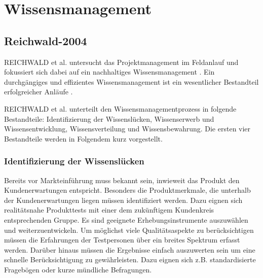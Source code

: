 \section{Wissensmanagement}
\subsection*{Reichwald-2004}
REICHWALD et al. untersucht das Projektmanagement im Feldanlauf und fokussiert sich dabei auf ein nachhaltiges Wissensmanagement \cite{Reichwald2004}. Ein durchgängiges und effizientes Wissensmanagement ist ein wesentlicher Bestandteil erfolgreicher Anläufe \cite{Kuhn2002}. %

REICHWALD et al. unterteilt den Wissensmanagementprozess in folgende Bestandteile: Identifizierung der Wissenslücken, Wissenserwerb und Wissensentwicklung, Wissensverteilung und Wissensbewahrung. Die ersten vier Bestandteile werden in Folgendem kurz vorgestellt. 

\subsubsection*{Identifizierung der Wissenslücken}
Bereits vor Markteinführung muss bekannt sein, inwieweit das Produkt den Kundenerwartungen entspricht. Besonders die Produktmerkmale, die unterhalb der Kundenerwartungen liegen müssen identifiziert werden. Dazu eignen sich realitätsnahe Produkttests mit einer dem zukünftigem Kundenkreis entsprechenden Gruppe. Es sind geeignete Erhebungsinstrumente auszuwählen und weiterzuentwickeln. Um möglichst viele Qualitätsaspekte zu berücksichtigen müssen die Erfahrungen der Testpersonen über ein breites Spektrum erfasst werden. Darüber hinaus müssen die Ergebnisse einfach auszuwerten sein um eine schnelle Berücksichtigung zu gewährleisten. Dazu eignen sich z.B. standardisierte Fragebögen oder kurze mündliche Befragungen. 

